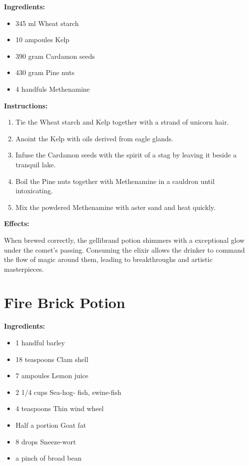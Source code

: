 \documentclass{article}
\begin{document}
\textbf{Ingredients:}

\begin{itemize}
  \item 345 ml Wheat starch
  \item 10 ampoules Kelp
  \item 390 gram Cardamon seeds
  \item 430 gram Pine nuts
  \item 4 handfuls Methenamine
\end{itemize}

\textbf{Instructions:}

\begin{enumerate}
  \item Tie the Wheat starch and Kelp together with a strand of unicorn hair.
  \item Anoint the Kelp with oils derived from eagle glands.
  \item Infuse the Cardamon seeds with the spirit of a stag by leaving it beside a tranquil lake.
  \item Boil the Pine nuts together with Methenamine in a cauldron until intoxicating.
  \item Mix the powdered Methenamine with aster sand and heat quickly.
\end{enumerate}

\textbf{Effects:}

When brewed correctly, the gellibrand potion shimmers with a exceptional glow under the comet’s passing. Consuming the elixir allows the drinker to command the flow of magic around them, leading to breakthroughs and artistic masterpieces.

\newpage
\section*{Fire Brick Potion}

\textbf{Ingredients:}

\begin{itemize}
  \item 1 handful barley
  \item 18 teaspoons Clam shell
  \item 7 ampoules Lemon juice
  \item 2 1/4 cups Sea-hog- fish, swine-fish
  \item 4 teaspoons Thin wind wheel
  \item Half a portion Goat fat
  \item 8 drops Sneeze-wort
  \item a pinch of broad bean
\end{itemize}
\end{document}
